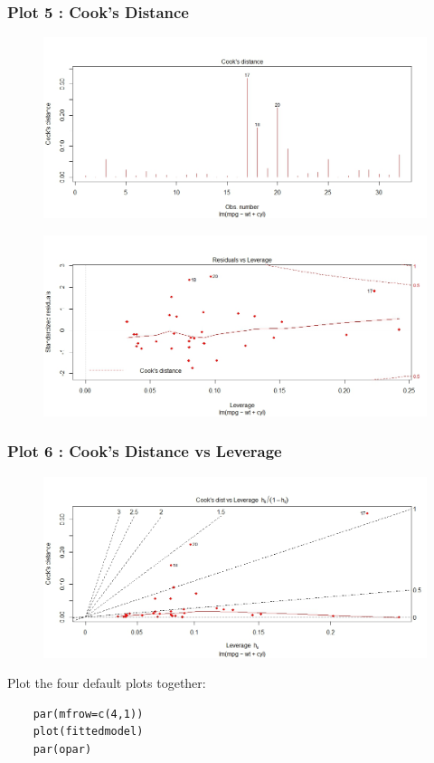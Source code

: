 \documentclass[residuals.tex]{subfiles}
\begin{document}
\newpage
\subsubsection*{Plot 5 :  Cook's Distance}
\begin{figure}[h!]
	\centering
	\includegraphics[width=0.95\linewidth]{./mtcarsDiagPlot4}
	
	\label{mtcarsDiagPlot4}
\end{figure}



\begin{figure}[h!]
	\centering
	\includegraphics[width=0.9\linewidth]{./mtcarsDiagPlot5}
	
	\label{mtcarsDiagPlot5}
\end{figure}
\newpage

\subsubsection*{Plot 6 :  Cook's Distance vs Leverage}
\begin{figure}[h!]
	\centering
	\includegraphics[width=0.95\linewidth]{./mtcarsDiagPlot6}
	
	\label{mtcarsDiagPlot6}
\end{figure}

Plot the four default plots together:
\begin{framed}
	\begin{verbatim}
	par(mfrow=c(4,1))
	plot(fittedmodel)
	par(opar)
	\end{verbatim}
\end{framed}

\end{document}
